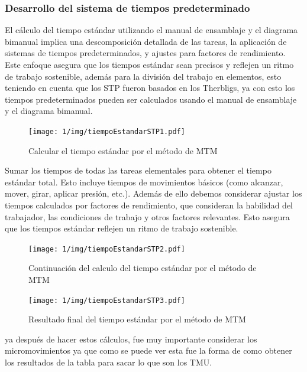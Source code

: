     \subsubsection{Desarrollo del sistema de tiempos predeterminado}
    El cálculo del tiempo estándar utilizando el manual de ensamblaje y el diagrama bimanual implica una descomposición detallada de las tareas, la aplicación de sistemas de tiempos predeterminados, y ajustes para factores de rendimiento. Este enfoque asegura que los tiempos estándar sean precisos y reflejen un ritmo de trabajo sostenible, además para la división del trabajo en elementos, esto teniendo en cuenta que los STP fueron basados en los Therbligs, ya con esto los tiempos predeterminados pueden ser calculados usando el manual de ensamblaje y el diagrama bimanual.
     \begin{figure}[H]
            \centering
            \texttt{[image: 1/img/tiempoEstandarSTP1.pdf]}
            \caption{Calcular el tiempo estándar por el método de MTM}
            \label{fig:tiempoEstandarSTP1}
        \end{figure}
    Sumar los tiempos de todas las tareas elementales para obtener el tiempo estándar total. Esto incluye tiempos de movimientos básicos (como alcanzar, mover, girar, aplicar presión, etc.).
    Además de ello debemos considerar ajustar los tiempos calculados por factores de rendimiento, que consideran la habilidad del trabajador, las condiciones de trabajo y otros factores relevantes. Esto asegura que los tiempos estándar reflejen un ritmo de trabajo sostenible.
        \begin{figure}[H]
            \centering
            \texttt{[image: 1/img/tiempoEstandarSTP2.pdf]}
            \caption{Continuación del calculo del tiempo estándar por el método de MTM}
            \label{fig:tiempoEstandarSTP2}
        \end{figure}
        
        \begin{figure}[H]
            \centering
            \texttt{[image: 1/img/tiempoEstandarSTP3.pdf]}
            \caption{Resultado final del tiempo estándar por el método de MTM}
            \label{fig:tiempoEstandarSTP3}
        \end{figure}
    ya después de hacer estos cálculos, fue muy importante considerar los micromovimientos ya que como se puede ver esta fue la forma de como obtener los resultados de la tabla para sacar lo que son los TMU.
    
